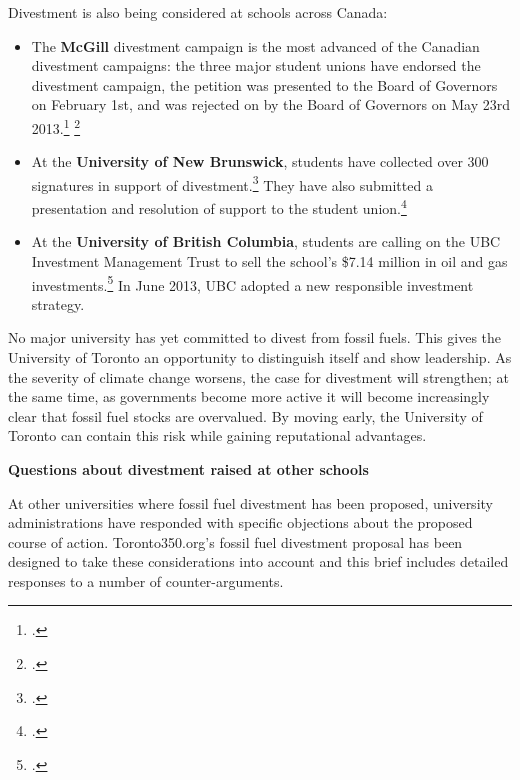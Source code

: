 Divestment is also being considered at schools across Canada:
\begin{itemize}
	\item The \textbf{McGill} divestment campaign is the most advanced of the Canadian divestment campaigns: the three major student unions have endorsed the divestment campaign, the petition was presented to the Board of Governors on February 1st, and was rejected on by the Board of Governors on May 23rd 2013.\footcite[][]{McGillStudentExecs} \footcite[][]{McGillDelivers}
	\item At the \textbf{University of New Brunswick}, students have collected over 300 signatures in support of divestment.\footcite[][]{UNBPetition} They have also submitted a presentation and resolution of support to the student union.\footcite[][]{UNBStudentUnion}
	\item At the \textbf{University of British Columbia}, students are calling on the UBC Investment Management Trust to sell the school's \$7.14 million in oil and gas investments.\footcite[][]{UBCDivest} In June 2013, UBC adopted a new responsible investment strategy.
\end{itemize}



No major university has yet committed to divest from fossil fuels.
This gives the University of Toronto an opportunity to distinguish itself and show leadership.
As the severity of climate change worsens, the case for divestment will strengthen; at the same time, as governments become more active it will become increasingly clear that fossil fuel stocks are overvalued.
By moving early, the University of Toronto can contain this risk while gaining reputational advantages.



\textbf{Questions about divestment raised at other schools}


At other universities where fossil fuel divestment has been proposed, university administrations have responded with specific objections about the proposed course of action.
Toronto350.org's fossil fuel divestment proposal has been designed to take these considerations into account and this brief includes detailed responses to a number of counter-arguments.



